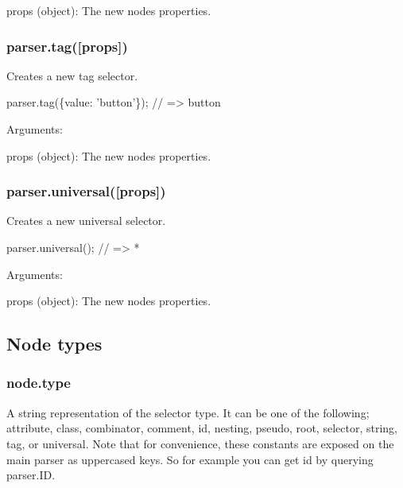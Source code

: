 \begin{DoxyItemize}
\item {\ttfamily props (object)}\+: The new node\textquotesingle{}s properties.
\end{DoxyItemize}

\subsubsection*{{\ttfamily parser.\+tag(\mbox{[}props\mbox{]})}}

Creates a new tag selector.


\begin{DoxyCode}
parser.tag(\{value: 'button'\});
// => button
\end{DoxyCode}


Arguments\+:


\begin{DoxyItemize}
\item {\ttfamily props (object)}\+: The new node\textquotesingle{}s properties.
\end{DoxyItemize}

\subsubsection*{{\ttfamily parser.\+universal(\mbox{[}props\mbox{]})}}

Creates a new universal selector.


\begin{DoxyCode}
parser.universal();
// => *
\end{DoxyCode}


Arguments\+:


\begin{DoxyItemize}
\item {\ttfamily props (object)}\+: The new node\textquotesingle{}s properties.
\end{DoxyItemize}

\subsection*{Node types}

\subsubsection*{{\ttfamily node.\+type}}

A string representation of the selector type. It can be one of the following; {\ttfamily attribute}, {\ttfamily class}, {\ttfamily combinator}, {\ttfamily comment}, {\ttfamily id}, {\ttfamily nesting}, {\ttfamily pseudo}, {\ttfamily root}, {\ttfamily selector}, {\ttfamily string}, {\ttfamily tag}, or {\ttfamily universal}. Note that for convenience, these constants are exposed on the main {\ttfamily parser} as uppercased keys. So for example you can get {\ttfamily id} by querying {\ttfamily parser.\+ID}.


